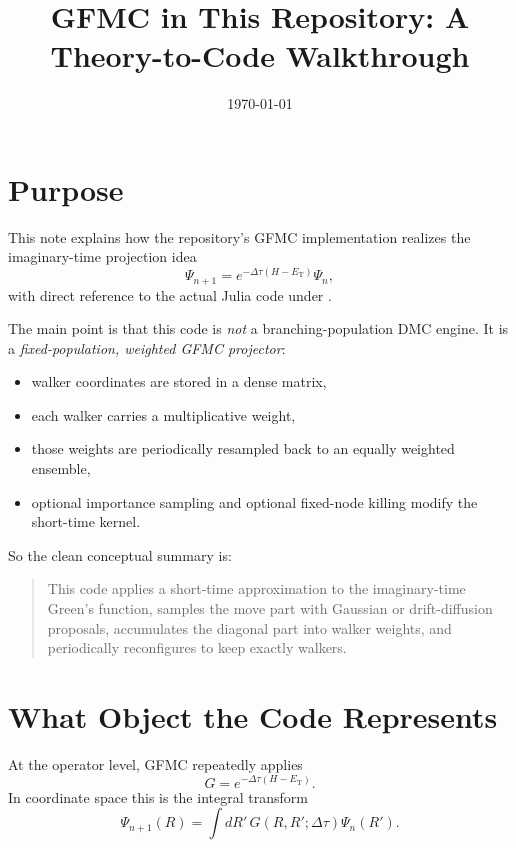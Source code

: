 \documentclass[11pt]{article}
\title{GFMC in This Repository: A Theory-to-Code Walkthrough}
\author{}
\date{\today}
\newcommand{\code}[1]{\texttt{\detokenize{#1}}}
\newcommand{\dtau}{\Delta\tau}
\newcommand{\ET}{E_{\mathrm{T}}}
\begin{document}
\maketitle
\tableofcontents

\section{Purpose}

This note explains how the repository's GFMC implementation realizes the
imaginary-time projection idea
\begin{equation}
\Psi_{n+1} = e^{-\dtau(H-\ET)} \Psi_n,
\end{equation}
with direct reference to the actual Julia code under
\code{src/UseCases/gfmc/}.

The main point is that this code is \emph{not} a branching-population DMC
engine. It is a \emph{fixed-population, weighted GFMC projector}:
\begin{itemize}
    \item walker coordinates are stored in a dense matrix,
    \item each walker carries a multiplicative weight,
    \item those weights are periodically resampled back to an equally weighted
    ensemble,
    \item optional importance sampling and optional fixed-node killing modify
    the short-time kernel.
\end{itemize}

So the clean conceptual summary is:
\begin{quote}
This code applies a short-time approximation to the imaginary-time Green's
function, samples the move part with Gaussian or drift-diffusion proposals,
accumulates the diagonal part into walker weights, and periodically
reconfigures to keep exactly \code{targetN} walkers.
\end{quote}

\section{What Object the Code Represents}

At the operator level, GFMC repeatedly applies
\begin{equation}
G = e^{-\dtau(H-\ET)}.
\end{equation}
In coordinate space this is the integral transform
\begin{equation}
\Psi_{n+1}(R) = \int dR' \, G(R,R';\dtau)\Psi_n(R').
\end{equation}
\end{document}
